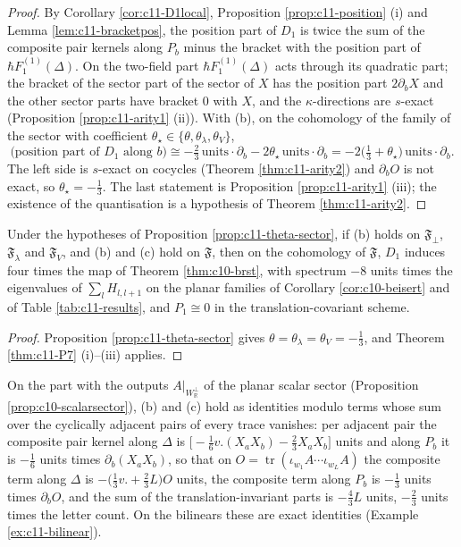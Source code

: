 \begin{proof}
By Corollary \ref{cor:c11-D1local}, Proposition \ref{prop:c11-position} (i) and Lemma \ref{lem:c11-bracketpos}, the position part of $D_1$ is twice the sum of the composite pair kernels along $P_b$ minus the bracket with the position part of $\hbar F_1^{(1)}(\Delta)$. On the two-field part $\hbar F_1^{(1)}(\Delta)$ acts through its quadratic part; the bracket of the sector part of the sector of $X$ has the position part $2\partial_bX$ and the other sector parts have bracket $0$ with $X$, and the $\kappa$-directions are $s$-exact (Proposition \ref{prop:c11-arity1} (ii)). With (b), on the cohomology of the family of the sector with coefficient $\theta_\star\in\{\theta,\theta_\lambda,\theta_V\}$,
\[
\big(\text{position part of }D_1\text{ along }b\big)\cong-\tfrac23\,\text{units}\cdot\partial_b-2\theta_\star\,\text{units}\cdot\partial_b=-2\big(\tfrac13+\theta_\star\big)\,\text{units}\cdot\partial_b .
\]
The left side is $s$-exact on cocycles (Theorem \ref{thm:c11-arity2}) and $\partial_bO$ is not exact, so $\theta_\star=-\tfrac13$. The last statement is Proposition \ref{prop:c11-arity1} (iii); the existence of the quantisation is a hypothesis of Theorem \ref{thm:c11-arity2}.
\end{proof}

\begin{corollary}
\label{cor:c11-noA}
Under the hypotheses of Proposition \ref{prop:c11-theta-sector}, if (b) holds on $\mathfrak F_\perp$, $\mathfrak F_\lambda$ and $\mathfrak F_V$, and (b) and (c) hold on $\mathfrak F$, then on the cohomology of $\mathfrak F$, $D_1$ induces four times the map of Theorem \ref{thm:c10-brst}, with spectrum $-8$ units times the eigenvalues of $\sum_lH_{l,l+1}$ on the planar families of Corollary \ref{cor:c10-beisert} and of Table \ref{tab:c11-results}, and $P_1\cong0$ in the translation-covariant scheme.
\end{corollary}

\begin{proof}
Proposition \ref{prop:c11-theta-sector} gives $\theta=\theta_\lambda=\theta_V=-\tfrac13$, and Theorem \ref{thm:c11-P7} (i)--(iii) applies.
\end{proof}

\begin{proposition}
\label{prop:c11-scalar}
On the part with the outputs $A|_{W_{\mathbb R}^\perp}$ of the planar scalar sector (Proposition \ref{prop:c10-scalarsector}), (b) and (c) hold as identities modulo terms whose sum over the cyclically adjacent pairs of every trace vanishes: per adjacent pair the composite pair kernel along $\Delta$ is $\big[-\tfrac16v.(X_aX_b)-\tfrac23X_aX_b\big]$ units and along $P_b$ it is $-\tfrac16$ units times $\partial_b(X_aX_b)$, so that on $O=\operatorname{tr}(\iota_{w_1}A\cdots\iota_{w_L}A)$ the composite term along $\Delta$ is $-\big(\tfrac13v.+\tfrac23L\big)O$ units, the composite term along $P_b$ is $-\tfrac13$ units times $\partial_bO$, and the sum of the translation-invariant parts is $-\tfrac43L$ units, $-\tfrac23$ units times the letter count. On the bilinears these are exact identities (Example \ref{ex:c11-bilinear}).
\end{proposition}

